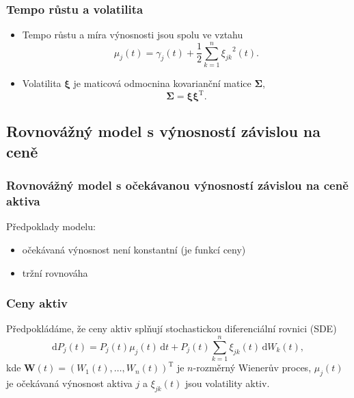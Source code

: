 \documentclass[xcolor=dvipsnames]{beamer}
\theoremstyle{definition} \newtheorem{definice}[veta]{Definice}
\theoremstyle{remark}
\begin{document}
\begin{frame}
  \frametitle{Tempo růstu a volatilita}
  \begin{itemize}
  \item Tempo růstu a míra výnosnosti jsou spolu ve vztahu
        $$\mu_j(t)=\gamma_j(t)+\frac12\sum_{k=1}^{n}{\xi_{jk}}^2(t).$$
  \item Volatilita $\boldsymbol{\xi}$ je maticová odmocnina kovarianční matice $\boldsymbol{\Sigma}$, 
        $$\boldsymbol{\Sigma}=\boldsymbol{\xi}\boldsymbol{\xi}^\mathrm{T}.$$
 \end{itemize}     
\end{frame}

\subsection{Rovnovážný model s výnosností závislou na ceně}

\begin{frame}
  \frametitle{Rovnovážný model s očekávanou výnosností závislou na ceně aktiva}
 \textcolor{OliveGreen}{Předpoklady modelu:}
  \begin{itemize}
   \item očekávaná výnosnost není konstantní (je funkcí ceny)
   \item tržní rovnováha
  \end{itemize}
\end{frame}

\begin{frame}
  \frametitle{Ceny aktiv}
  Předpokládáme, že ceny aktiv splňují stochastickou diferenciální rovnici (SDE)
  \begin{equation} \label{SDE}
 \mathrm{d}P_j(t)=P_j(t)\mu_j(t)\,\mathrm{d}t+P_j(t)\sum_{k=1}^{n}\xi_{jk}(t)\,\mathrm{d}W_k(t),
  \end{equation}
  kde $\boldsymbol{W}(t)=(W_1(t),\dots,W_n(t))^\mathrm{T}$ je $n$-rozměrný Wienerův proces, $\mu_j(t)$ je očekávaná výnosnost aktiva $j$
  a $\xi_{jk}(t)$ jsou volatility aktiv. 
\end{frame}
\end{document}
